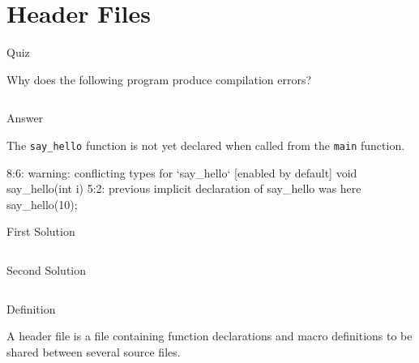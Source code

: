 \documentclass[compress]{beamer}
\begin{document}
\prepareCover

\section{Header Files}

\begin{slide}
	\begin{block}{Quiz}

	Why does the following program produce compilation errors?

	\inputminted[fontsize=\scriptsize, firstline=12, linenos]{c}{
		\resDirectory/hello1.c
	}

	\end{block}
\end{slide}

\begin{slide}
	\begin{block}{Answer}

	The \texttt{say\_hello} function is not yet declared when called from the \texttt{main} function.

	\begin{terminal}
	8:6: warning: conflicting types for `say_hello` [enabled by default]
	void say_hello(int i)
	5:2: previous implicit declaration of say_hello was here
	say_hello(10);
	\end{terminal}

	\end{block}
\end{slide}

\begin{slide}
	\begin{block}{First Solution}

	\inputminted[fontsize=\footnotesize, firstline=10, linenos]{c}{
		\resDirectory/hello2.c
	}

	\end{block}
\end{slide}

\begin{slide}
	\begin{block}{Second Solution}

	\inputminted[fontsize=\footnotesize, firstline=10, linenos]{c}{
		\resDirectory/hello1.c
	}

	\end{block}
\end{slide}

\begin{slide}
	\begin{block}{Definition}

	A header file is a file containing function declarations and macro definitions to be shared between several source files.

	\end{block}
\end{slide}
\end{document}
